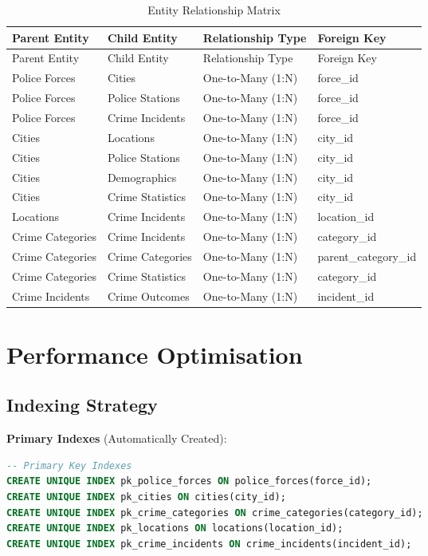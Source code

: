 \documentclass[12pt,a4paper]{article}
\begin{document}
\begin{longtable}{@{}llll@{}}
\caption{Entity Relationship Matrix} \\
\toprule
Parent Entity & Child Entity & Relationship Type & Foreign Key \\
\midrule
\endfirsthead
\toprule
Parent Entity & Child Entity & Relationship Type & Foreign Key \\
\midrule
\endhead
Police Forces & Cities & One-to-Many (1:N) & force\_id \\
Police Forces & Police Stations & One-to-Many (1:N) & force\_id \\
Police Forces & Crime Incidents & One-to-Many (1:N) & force\_id \\
Cities & Locations & One-to-Many (1:N) & city\_id \\
Cities & Police Stations & One-to-Many (1:N) & city\_id \\
Cities & Demographics & One-to-Many (1:N) & city\_id \\
Cities & Crime Statistics & One-to-Many (1:N) & city\_id \\
Locations & Crime Incidents & One-to-Many (1:N) & location\_id \\
Crime Categories & Crime Incidents & One-to-Many (1:N) & category\_id \\
Crime Categories & Crime Categories & One-to-Many (1:N) & parent\_category\_id \\
Crime Categories & Crime Statistics & One-to-Many (1:N) & category\_id \\
Crime Incidents & Crime Outcomes & One-to-Many (1:N) & incident\_id \\
\bottomrule
\end{longtable}

\section{Performance Optimisation}

\subsection{Indexing Strategy}

\textbf{Primary Indexes} (Automatically Created):
\begin{lstlisting}[language=SQL]
-- Primary Key Indexes
CREATE UNIQUE INDEX pk_police_forces ON police_forces(force_id);
CREATE UNIQUE INDEX pk_cities ON cities(city_id);
CREATE UNIQUE INDEX pk_crime_categories ON crime_categories(category_id);
CREATE UNIQUE INDEX pk_locations ON locations(location_id);
CREATE UNIQUE INDEX pk_crime_incidents ON crime_incidents(incident_id);
\end{lstlisting}
\end{document}
